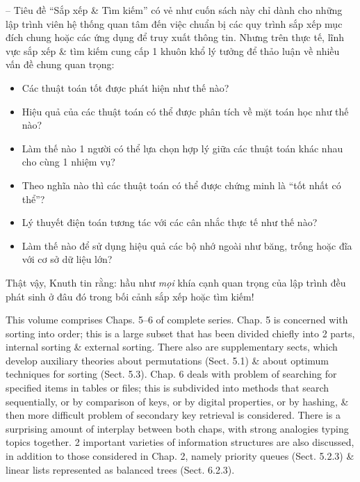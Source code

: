 \documentclass{article}
\begin{document}
\begin{itemize}
    -- Tiêu đề ``Sắp xếp \& Tìm kiếm'' có vẻ như cuốn sách này chỉ dành cho những lập trình viên hệ thống quan tâm đến việc chuẩn bị các quy trình sắp xếp mục đích chung hoặc các ứng dụng để truy xuất thông tin. Nhưng trên thực tế, lĩnh vực sắp xếp \& tìm kiếm cung cấp 1 khuôn khổ lý tưởng để thảo luận về nhiều vấn đề chung quan trọng:
    \begin{itemize}
        \item Các thuật toán tốt được phát hiện như thế nào?
        \item Hiệu quả của các thuật toán có thể được phân tích về mặt toán học như thế nào?
        \item Làm thế nào 1 người có thể lựa chọn hợp lý giữa các thuật toán khác nhau cho cùng 1 nhiệm vụ?
        \item Theo nghĩa nào thì các thuật toán có thể được chứng minh là ``tốt nhất có thể''?
        \item Lý thuyết điện toán tương tác với các cân nhắc thực tế như thế nào?
        \item Làm thế nào để sử dụng hiệu quả các bộ nhớ ngoài như băng, trống hoặc đĩa với cơ sở dữ liệu lớn?
    \end{itemize}
    Thật vậy, {\sc Knuth} tin rằng: hầu như {\it mọi} khía cạnh quan trọng của lập trình đều phát sinh ở đâu đó trong bối cảnh sắp xếp hoặc tìm kiếm!
    
    This volume comprises Chaps. 5--6 of complete series. Chap. 5 is concerned with sorting into order; this is a large subset that has been divided chiefly into 2 parts, internal sorting \& external sorting. There also are supplementary sects, which develop auxiliary theories about permutations (Sect. 5.1) \& about optimum techniques for sorting (Sect. 5.3). Chap. 6 deals with problem of searching for specified items in tables or files; this is subdivided into methods that search sequentially, or by comparison of keys, or by digital properties, or by hashing, \& then more difficult problem of secondary key retrieval is considered. There is a surprising amount of interplay between both chaps, with strong analogies typing topics together. 2 important varieties of information structures are also discussed, in addition to those considered in Chap. 2, namely priority queues (Sect. 5.2.3) \& linear lists represented as balanced trees (Sect. 6.2.3).
    

\end{itemize}
\end{document}
